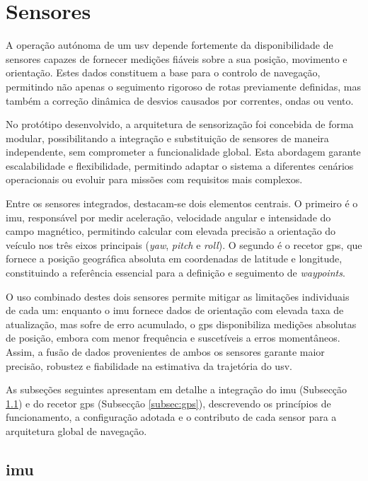 \section{Sensores} 
\label{sec:sensores}

A operação autónoma de um \gls{usv} depende fortemente da disponibilidade de sensores capazes de fornecer medições fiáveis sobre a sua posição, movimento e orientação. Estes dados constituem a base para o controlo de navegação, permitindo não apenas o seguimento rigoroso de rotas previamente definidas, mas também a correção dinâmica de desvios causados por correntes, ondas ou vento.  

No protótipo desenvolvido, a arquitetura de sensorização foi concebida de forma modular, possibilitando a integração e substituição de sensores de maneira independente, sem comprometer a funcionalidade global. Esta abordagem garante escalabilidade e flexibilidade, permitindo adaptar o sistema a diferentes cenários operacionais ou evoluir para missões com requisitos mais complexos.  

Entre os sensores integrados, destacam-se dois elementos centrais. O primeiro é o \acrfull{imu}, responsável por medir aceleração, velocidade angular e intensidade do campo magnético, permitindo calcular com elevada precisão a orientação do veículo nos três eixos principais (\emph{yaw}, \emph{pitch} e \emph{roll}). O segundo é o recetor \acrfull{gps}, que fornece a posição geográfica absoluta em coordenadas de latitude e longitude, constituindo a referência essencial para a definição e seguimento de \emph{waypoints}.  

O uso combinado destes dois sensores permite mitigar as limitações individuais de cada um: enquanto o \gls{imu} fornece dados de orientação com elevada taxa de atualização, mas sofre de erro acumulado, o \gls{gps} disponibiliza medições absolutas de posição, embora com menor frequência e suscetíveis a erros momentâneos. Assim, a fusão de dados provenientes de ambos os sensores garante maior precisão, robustez e fiabilidade na estimativa da trajetória do \gls{usv}.  

As subseções seguintes apresentam em detalhe a integração do \acrfull{imu} (Subsecção \ref{subsec:imu}) e do recetor \acrfull{gps} (Subsecção \ref{subsec:gps}), descrevendo os princípios de funcionamento, a configuração adotada e o contributo de cada sensor para a arquitetura global de navegação.


\subsection{\acrfull{imu}} \label{subsec:imu}


